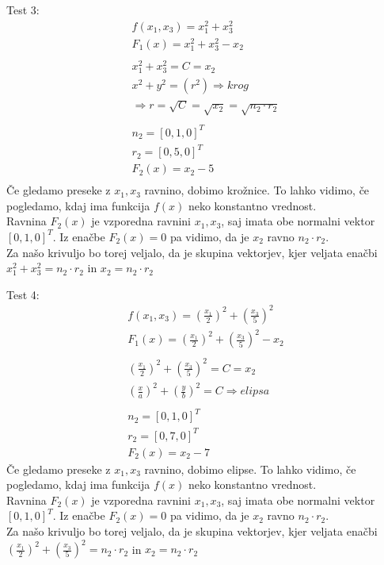\documentclass[12pt, letterpaper, twoside]{article}    %
\begin{document}
$$$$

Test 3:
\begin{equation}
\begin{split}
f(x_1, x_3) = x_1^2 + x_3^2 \\
F_1(x) = x_1^2 + x_3^2 - x_2 \\
\\
x_1^2 + x_3^2 = C = x_2 \\
x^2 + y^2 = (r^2) \Rightarrow krog \\
\Rightarrow r = \sqrt{C} = \sqrt{x_2} = \sqrt{n_2 \cdot r_2} \\
\\
n_2 = [0, 1, 0]^T \\
r_2 = [0, 5, 0]^T \\
F_2(x) = x_2 - 5\\
\end{split}
\end{equation}
Če gledamo preseke z $x_1, x_3$ ravnino, dobimo krožnice.
To lahko vidimo, če pogledamo, kdaj ima funkcija $f(x)$ neko konstantno vrednost. \\
Ravnina $F_2(x)$ je vzporedna ravnini $x_1, x_3$, saj imata obe normalni vektor $[0, 1, 0]^T$.
Iz enačbe $F_2(x) = 0$ pa vidimo, da je $x_2$ ravno $n_2 \cdot r_2$. \\
Za našo krivuljo bo torej veljalo, da je skupina vektorjev, kjer veljata enačbi $x_1^2 + x_3^2 = n_2 \cdot r_2$ in $x_2 = n_2 \cdot r_2$ \\

$$$$
$$$$

Test 4:
\begin{equation}
\begin{split}
f(x_1, x_3) = (\frac{x_1}{2})^2 + (\frac{x_3}{5})^2 \\
F_1(x) = (\frac{x_1}{2})^2 + (\frac{x_3}{5})^2 - x_2 \\
\\
(\frac{x_1}{2})^2 + (\frac{x_3}{5})^2 = C = x_2 \\
(\frac{x}{a})^2 + (\frac{y}{b})^2 = C \Rightarrow elipsa \\
\\
n_2 = [0, 1, 0]^T \\
r_2 = [0, 7, 0]^T \\
F_2(x) = x_2 - 7
\end{split}
\end{equation}
Če gledamo preseke z $x_1, x_3$ ravnino, dobimo elipse.
To lahko vidimo, če pogledamo, kdaj ima funkcija $f(x)$ neko konstantno vrednost. \\
Ravnina $F_2(x)$ je vzporedna ravnini $x_1, x_3$, saj imata obe normalni vektor $[0, 1, 0]^T$.
Iz enačbe $F_2(x) = 0$ pa vidimo, da je $x_2$ ravno $n_2 \cdot r_2$. \\
Za našo krivuljo bo torej veljalo, da je skupina vektorjev, kjer veljata enačbi $(\frac{x_1}{2})^2 + (\frac{x_3}{5})^2 = n_2 \cdot r_2$ in $x_2 = n_2 \cdot r_2$ \\
\end{document}
